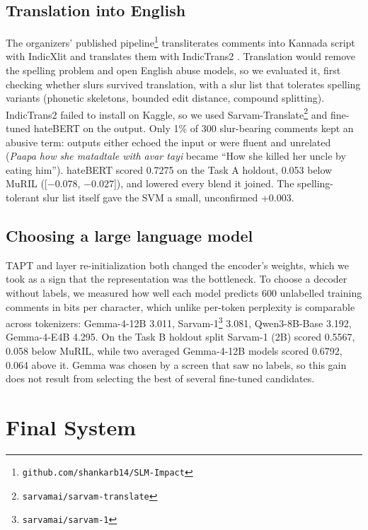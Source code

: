 \documentclass[11pt]{article}
\newcommand{\taska}{Task A}
\newcommand{\taskb}{Task B}
\begin{document}
\subsection{Translation into English}
The organizers' published pipeline\footnote{\texttt{github.com/shankarb14/SLM-Impact}}
transliterates comments into Kannada script with IndicXlit
\citep{madhani-etal-2023-aksharantar} and translates them with IndicTrans2
\citep{gala-etal-2023-indictrans2}. Translation would remove the spelling problem
and open English abuse models, so we evaluated it, first checking whether slurs
survived translation, with a slur list that tolerates spelling variants (phonetic skeletons,
bounded edit distance, compound splitting). IndicTrans2 failed to install on
Kaggle, so we used Sarvam-Translate\footnote{\texttt{sarvamai/sarvam-translate}}
and fine-tuned hateBERT \citep{caselli-etal-2021-hatebert} on the output. Only
1\% of 300 slur-bearing comments kept an abusive term: outputs either echoed the
input or were fluent and unrelated (\textit{Paapa how she matadtale with avar
tayi} became ``How she killed her uncle by eating him''). hateBERT scored 0.7275
on the \taska{} holdout, 0.053 below MuRIL ([$-0.078$, $-0.027$]), and lowered
every blend it joined. The spelling-tolerant slur list itself gave the SVM a small,
unconfirmed +0.003.

\subsection{Choosing a large language model}
TAPT and layer re-initialization both changed the encoder's weights, which we
took as a sign that the representation was the bottleneck. To choose a decoder
without labels, we measured how well each model predicts 600 unlabelled training
comments in bits per character, which unlike per-token perplexity is comparable
across tokenizers: Gemma-4-12B 3.011, Sarvam-1\footnote{\texttt{sarvamai/sarvam-1}}
3.081, Qwen3-8B-Base \citep{yang-etal-2025-qwen3} 3.192, Gemma-4-E4B 4.295. On the
\taskb{} holdout split Sarvam-1 (2B) scored 0.5567, 0.058 below MuRIL, while two
averaged Gemma-4-12B models scored 0.6792, 0.064 above it. Gemma was chosen by a
screen that saw no labels, so this gain does not result from selecting the best
of several fine-tuned candidates.

\section{Final System}
\label{sec:final}
\end{document}
